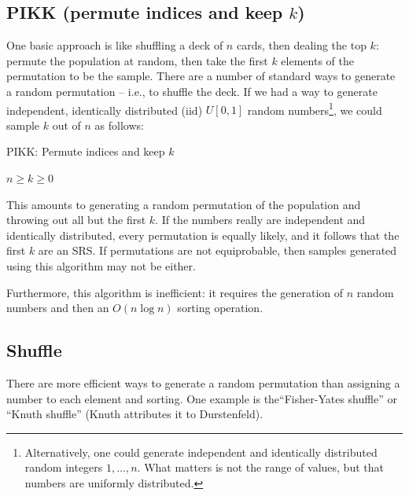 \documentclass[12pt]{article}
\begin{document}
\subsection{PIKK (permute indices and keep $k$)}
One basic approach is like shuffling a deck of $n$ cards, then dealing the top $k$: permute the population at random, then take the first $k$ elements of the permutation to be the sample.
There are a number of standard ways to generate a random permutation -- i.e., to shuffle the deck.
If we had a way to generate independent, identically distributed (iid) $U[0,1]$ random numbers\footnote{
Alternatively, one could generate independent and identically distributed random integers $1, \dots, n$.
What matters is not the range of values, but that numbers are uniformly distributed.}, we could sample $k$ out of $n$ as follows:

\begin{algorithm}                      %
\caption{PIKK: Permute indices and keep $k$}          %
\label{PIKK}                           %
\begin{algorithmic}[1]               %
    \Require $n \geq k \geq 0$
    \Statex
\end{algorithmic}
\end{algorithm}

This amounts to generating a random permutation of the population and throwing out all but the first $k$.
If the numbers really are independent and identically distributed, every permutation is equally likely, and it follows that the first $k$ are an SRS.
If permutations are not equiprobable, then samples generated using this algorithm may not be either.

Furthermore, this algorithm is inefficient: it requires the generation of $n$ random numbers and then an $O(n\log n)$ sorting operation.

\subsection{Shuffle}
There are more efficient ways to generate a random permutation than assigning a number to each element and sorting.
One example is the``Fisher-Yates shuffle'' or ``Knuth shuffle'' (Knuth attributes it to Durstenfeld).
\end{document}
